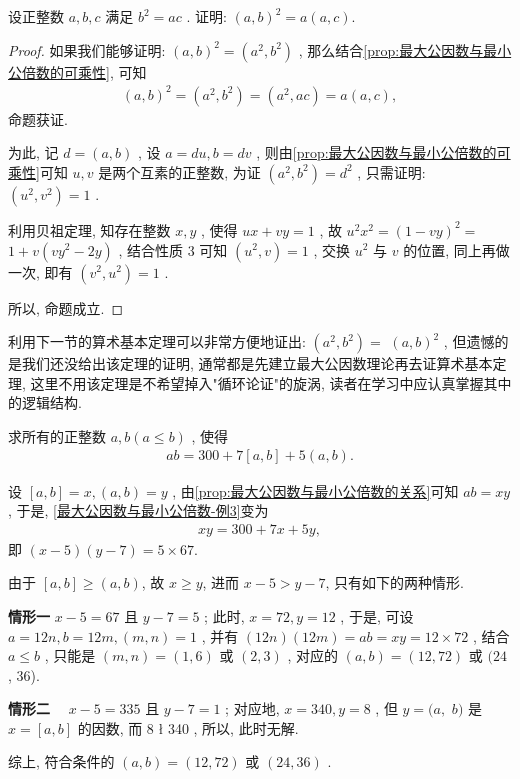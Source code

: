\begin{example}
	设正整数 $a ,  b ,  c$ 满足 $b^{2}=a c$ . 证明: $(a, b)^{2}=a(a, c)$.
\end{example}
\begin{proof}
	如果我们能够证明:  $(a, b)^{2}=\left(a^{2}, b^{2}\right)$ , 那么结合\autoref{prop:最大公因数与最小公倍数的可乘性}, 可知
\begin{align*}
	(a, b)^{2}=\left(a^{2}, b^{2}\right)=\left(a^{2}, a c\right)=a(a, c),
\end{align*}
命题获证.

为此, 记 $d=(a, b)$ , 设 $a=d u, b=d v$ , 则由\autoref{prop:最大公因数与最小公倍数的可乘性}可知 $u ,  v$ 是两个互素的正整数, 为证 $\left(a^{2}, b^{2}\right)=d^{2}$ , 只需证明:  $\left(u^{2}, v^{2}\right)=1$ .

利用贝祖定理, 知存在整数 $x ,  y$ , 使得 $u x+v y=1$ , 故 $u^{2} x^{2}=(1-v y)^{2}=$ $1+v\left(v y^{2}-2 y\right)$ , 结合性质 3 可知 $\left(u^{2}, v\right)=1$ , 交换 $u^{2}$ 与 $v$ 的位置, 同上再做一次, 即有 $\left(v^{2}, u^{2}\right)=1$ .

所以, 命题成立. 
\end{proof}
\begin{note}
利用下一节的算术基本定理可以非常方便地证出:  $\left(a^{2}, b^{2}\right)=$ $(a, b)^{2}$ , 但遗憾的是我们还没给出该定理的证明, 通常都是先建立最大公因数理论再去证算术基本定理, 这里不用该定理是不希望掉入"循环论证"的旋涡, 读者在学习中应认真掌握其中的逻辑结构.
\end{note}

\begin{example}
	求所有的正整数 $a ,  b(a \leqslant b)$ , 使得
\begin{align}\label{最大公因数与最小公倍数-例3}
	a b=300+7[a, b]+5(a, b).
\end{align}
\end{example}
\begin{solution}
设 $[a, b]=x,(a, b)=y$ , 由\autoref{prop:最大公因数与最小公倍数的关系}可知 $a b=x y$ , 于是, \autoref{最大公因数与最小公倍数-例3}变为
\begin{align*}
	x y=300+7 x+5 y,
\end{align*}
即 $(x-5)(y-7)=5 \times 67$. 

由于 $[a, b] \geqslant(a, b)$, 故 $x \geqslant y$, 进而 $x-5>y-7$, 只有如下的两种情形.

\textbf{情形一} $x-5=67$ 且 $y-7=5$ ; 此时,  $x=72, y=12$ , 于是, 可设 $a=12 n ,  b=12 m , (m, n)=1$ , 并有 $(12 n)(12 m)=a b=x y=12 \times 72$ , 结合 $a \leqslant b$ , 只能是 $(m, n)=(1,6)$ 或 $(2,3)$ , 对应的 $(a, b)=(12,72)$ 或 $(24$ ,  36).

\textbf{情形二} $\quad x-5=335$ 且 $y-7=1$ ; 对应地,  $x=340, y=8$ , 但 $y=(a , $ $b )$ 是 $x=[a, b]$ 的因数, 而 8 ł 340 , 所以, 此时无解.

综上, 符合条件的 $(a, b)=(12,72)$ 或 $(24,36)$ . 
\end{solution}

